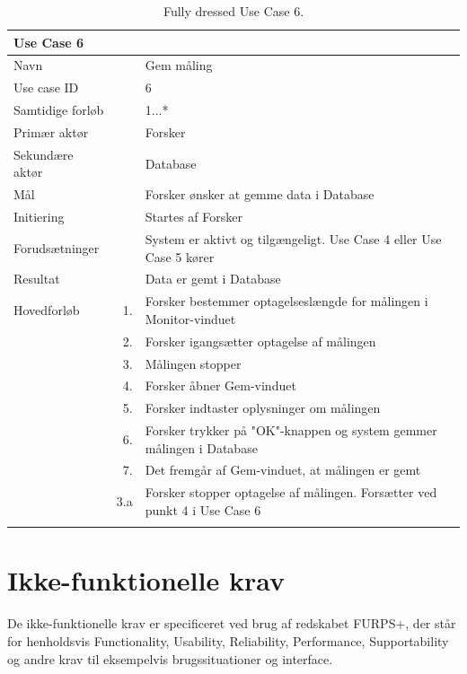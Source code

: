 \begin{longtabu} to  %
    {\large \textbf{Use Case 6}} && \\
    \toprule
    Navn &&    Gem måling\\
    Use case ID &&    6\\
    Samtidige forløb &&   1...*\\
    Primær aktør &&    Forsker\\
    Sekundære aktør &&	Database\\
    Mål &&    Forsker ønsker at gemme data i Database\\
    Initiering &&	Startes af Forsker\\
    Forudsætninger &&  System er aktivt og tilgængeligt. Use Case 4 eller Use Case 5 kører  \\
    Resultat &&		Data er gemt i Database                 \\ \midrule
    Hovedforløb &    1. &    Forsker bestemmer optagelseslængde for målingen i Monitor-vinduet \\[-1ex] 
  						 
                &    2. &    Forsker igangsætter optagelse af målingen 		 \\[-1ex] 
                &    3.	&	 Målingen stopper\\
                &	 4.	&	 Forsker åbner Gem-vinduet\\[-1ex]			 
                &	 5. &	 Forsker indtaster oplysninger om målingen \\[-1ex]
                &	 6. &	 Forsker trykker på "OK"\--knappen og system gemmer målingen i Database				 \\[-1ex]
                &	 7.	&	 Det fremgår af 	Gem-vinduet, at målingen 		 er gemt\newline\\ \midrule
                
      			&    3.a &   Forsker stopper optagelse af målingen. Forsætter ved punkt 4 i Use Case 6  \\
\bottomrule
    
\caption{Fully dressed Use Case 6.}
\label{UC6}
\end{longtabu}

\section{Ikke-funktionelle krav}
De ikke-funktionelle krav er specificeret ved brug af redskabet FURPS+, der står for henholdsvis Functionality, Usability, Reliability, Performance, Supportability og andre krav til eksempelvis brugssituationer og interface.  


